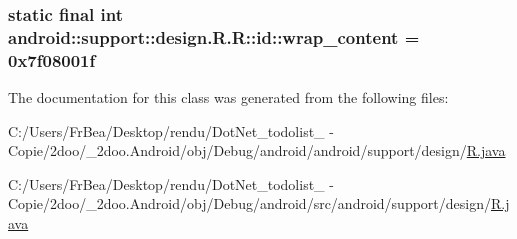 \hypertarget{classandroid_1_1support_1_1design_1_1_r_1_1id_ca332b2e85e5ee027ea2f38b753e2534}{
\subsubsection[{wrap\_\-content}]{\setlength{\rightskip}{0pt plus 5cm}static final int android::support::design.R.R::id::wrap\_\-content = 0x7f08001f}}
\label{classandroid_1_1support_1_1design_1_1_r_1_1id_ca332b2e85e5ee027ea2f38b753e2534}




The documentation for this class was generated from the following files:\begin{CompactItemize}
\item 
C:/Users/FrBea/Desktop/rendu/DotNet\_\-todolist\_ - Copie/2doo/\_\-2doo.Android/obj/Debug/android/android/support/design/\hyperlink{android_2support_2design_2_r_8java}{R.java}\item 
C:/Users/FrBea/Desktop/rendu/DotNet\_\-todolist\_ - Copie/2doo/\_\-2doo.Android/obj/Debug/android/src/android/support/design/\hyperlink{src_2android_2support_2design_2_r_8java}{R.java}\end{CompactItemize}
